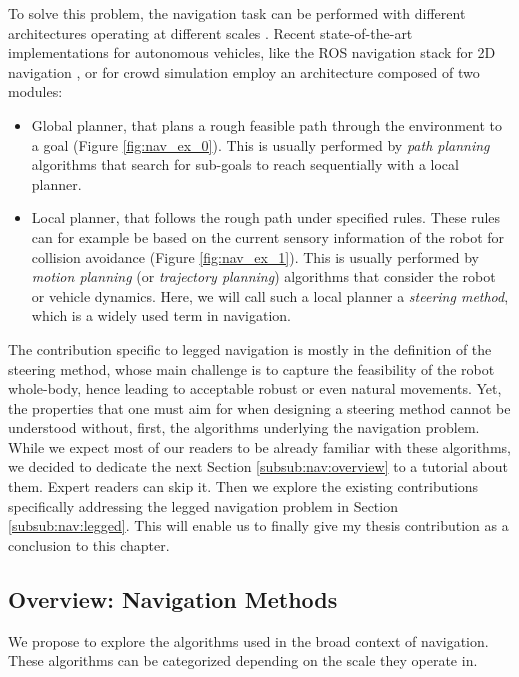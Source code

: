 To solve this problem, the navigation task can be performed with different architectures operating at different scales \cite{review_autonomous_2011}. 
Recent state-of-the-art implementations for autonomous vehicles, like the ROS navigation stack for 2D navigation \cite{ROS_software}, or for crowd simulation \cite{vantoll_microscopic_crowd_2021} employ an architecture composed of two modules:
\begin{itemize}
    \item Global planner, that plans a rough feasible path through the environment to a goal (Figure \ref{fig:nav_ex_0}). This is usually performed by \textit{path planning} algorithms that search for sub-goals to reach sequentially with a local planner.
    \item Local planner, that follows the rough path under specified rules. These rules can for example be based on the current sensory information of the robot for collision avoidance (Figure \ref{fig:nav_ex_1}). 
    This is usually performed by \textit{motion planning} (or \textit{trajectory planning}) algorithms that consider the robot or vehicle dynamics. Here, we will call such a local planner a \textit{steering method}, which is a widely used term in navigation.
\end{itemize}


The contribution specific to legged navigation is mostly in the definition of the steering method, whose main challenge is to capture the feasibility of the robot whole-body, hence leading to acceptable robust or even natural movements. Yet, the properties that one must aim for when designing a steering method cannot be understood without, first, the algorithms underlying the navigation problem.
While we expect most of our readers to be already familiar with these algorithms, we decided to dedicate the next Section \ref{subsub:nav:overview} to a tutorial about them. Expert readers can skip it. Then we explore the existing contributions specifically addressing
the legged navigation problem in Section \ref{subsub:nav:legged}. This will enable us to finally give my thesis contribution as a conclusion to this chapter.


\subsection{Overview: Navigation Methods\label{subsub:nav:overview}}
We propose to explore the algorithms used in the broad context of navigation.
These algorithms can be categorized depending on the scale they operate in.

